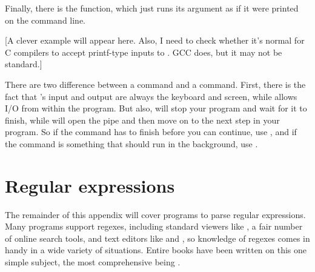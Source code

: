 
Finally, there is the  function, which just runs its
argument as if it were printed on the command line.

[A clever example will appear here. Also, I need to check whether it's
normal for C compilers to accept printf-type inputs to . GCC
does, but it may not be standard.]

There are two difference between a  command and a  command.
First, there is the fact that 's input and output are always
the keyboard and screen, while  allows I/O from within the program.
But also,  will stop your program and wait for it to finish,
while  will open the pipe and then move on to the next step in
your program. So if the command has to finish before you can continue,
use , and if the command is something that should run in the
background, use .


\section{Regular expressions}
The remainder of this appendix will cover programs to parse regular
expressions.  Many programs support regexes, including standard viewers
like , a fair number of online search tools, and text editors
like  and , so knowledge of regexes comes in handy
in a wide variety of situations. Entire books have been written on this
one simple subject, the most comprehensive being \citet{friedl:regex}.

